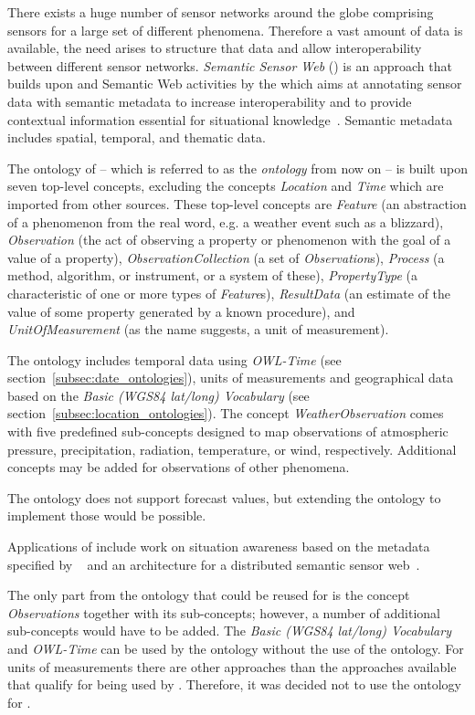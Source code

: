 There exists a huge number of sensor networks around the globe comprising sensors for a large set of different phenomena. Therefore a vast amount of data is available, the need arises to structure that data and allow interoperability between different sensor networks. \emph{Semantic Sensor Web} () is an approach that builds upon  and Semantic Web activities by the  which aims at annotating sensor data with semantic metadata to increase interoperability and to provide contextual information essential for situational knowledge~\cite{SemanticSensorWeb}. Semantic metadata includes spatial, temporal, and thematic data.

The ontology of  -- which is referred to as the \emph{ ontology} from now on -- is built upon seven top-level concepts, excluding the concepts \emph{Location} and \emph{Time} which are imported from other sources. These top-level concepts are \emph{Feature} (an abstraction of a phenomenon from the real word, e.g. a weather event such as a blizzard), \emph{Observation} (the act of observing a property or phenomenon with the goal of a value of a property), \emph{ObservationCollection} (a set of \emph{Observation}s), \emph{Process} (a method, algorithm, or instrument, or a system of these), \emph{PropertyType} (a characteristic of one or more types of \emph{Feature}s), \emph{ResultData} (an estimate of the value of some property generated by a known procedure), and \emph{UnitOfMeasurement} (as the name suggests, a unit of measurement).

The  ontology includes temporal data using \emph{OWL-Time} (see section~\ref{subsec:date_ontologies}), units of measurements and geographical data based on the \emph{Basic (WGS84 lat/long) Vocabulary} (see section~\ref{subsec:location_ontologies}). The concept \emph{WeatherObservation} comes with five predefined sub-concepts designed to map observations of atmospheric pressure, precipitation, radiation, temperature, or wind, respectively. Additional concepts may be added for observations of other phenomena.

The  ontology does not support forecast values, but extending the  ontology to implement those would be possible.

Applications of  include work on situation awareness based on the metadata specified by ~\cite{ssw_example1} and an architecture for a distributed semantic sensor web~\cite{ssw_example2}.

The only part from the  ontology that could be reused for \smarthomeweather is the concept \emph{Observations} together with its sub-concepts; however, a number of additional sub-concepts would have to be added. The \emph{Basic (WGS84 lat/long) Vocabulary} and \emph{OWL-Time} can be used by the \smarthomeweather ontology without the use of the  ontology. For units of measurements there are other approaches than the  approaches available that qualify for being used by \smarthomeweather. Therefore, it was decided not to use the  ontology for \smarthomeweather.

